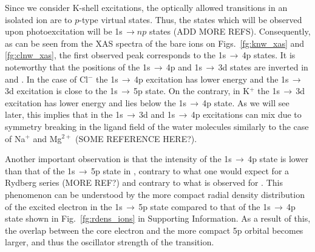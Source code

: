 

Since we consider K-shell excitations, the optically allowed transitions in an isolated ion are to $p$-type virtual states. Thus, the states which will be observed upon photoexcitation will be 1s$\,\rightarrow np$ states \citep{hertlein06:062715} (ADD MORE REFS). Consequently, as can be seen from the XAS spectra of the bare ions on Figs.\ \ref{fg:knw_xas} and \ref{fg:clnw_xas}, the first observed peak corresponds to the 1s$\,\rightarrow\,$4p states. It is noteworthy that the positions of the 1s$\,\rightarrow\,$4p and 1s$\,\rightarrow\,$3d states are inverted in \cli and \ki. In the case of Cl$^{-}$ the 1s$\,\rightarrow\,$4p excitation has lower energy and the 1s$\,\rightarrow\,$3d excitation is close to the 1s$\,\rightarrow\,$5p state. On the contrary, in K$^{+}$ the 1s$\,\rightarrow\,$3d excitation has lower energy and lies below the 1s$\,\rightarrow\,$4p state. As we will see later, this implies that in \ki the 1s$\,\rightarrow\,$3d and 1s$\,\rightarrow\,$4p excitations can mix due to symmetry breaking in the ligand field of the water molecules similarly to the case of Na$^{+}$ and Mg$^{2+}$ (SOME REFERENCE HERE?)\citep{miteva16:16671}.


Another important observation is that the intensity of the 1s$\,\rightarrow\,$4p state is lower than that of the 1s$\,\rightarrow\,$5p state in \cli, contrary to what one would expect for a Rydberg series \citep{hussain07:022710}(MORE REF?) and contrary to what is observed for \ki. This phenomenon can be understood by the more compact radial density distribution of the excited electron in the 1s$\,\rightarrow\,$5p state compared to that of the 1s$\,\rightarrow\,$4p state shown in Fig.\ \ref{fg:rdens_ions} in Supporting Information. As a result of this, the overlap between the core electron and the more compact 5p orbital becomes larger, and thus the oscillator strength of the transition.





